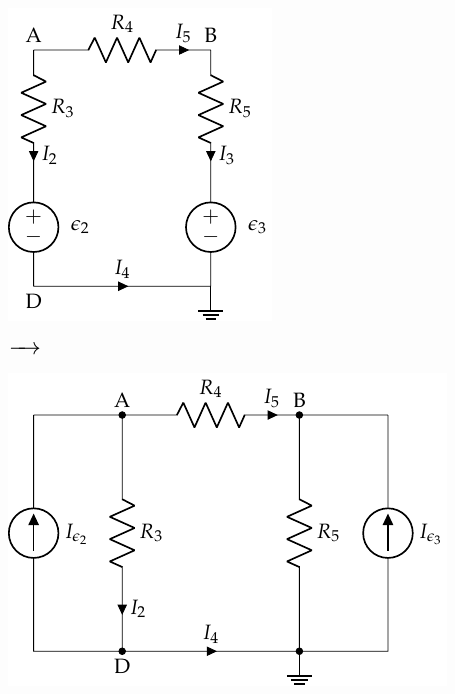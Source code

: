 \documentclass[10pt]{article}
\begin{document}
\begin{minipage}{0.32\linewidth}
    \begin{center}
        \includegraphics[scale=1.2]{figs/nudos_condensadores3.pdf}
    \end{center}
\end{minipage}
\begin{minipage}[c]{0.08\linewidth}
    \begin{center}
    $\LARGE \xrightarrow{\hspace*{0.5cm}}$ %
    \end{center}
\end{minipage}    
\begin{minipage}{0.6\linewidth}
    \begin{center}
        \includegraphics[scale=1.2]{figs/nudos_condensadores4.pdf}
    \end{center}
\end{minipage}
\end{document}
